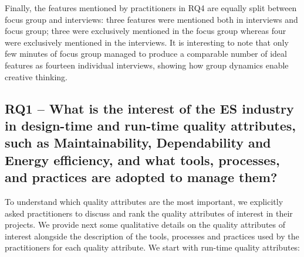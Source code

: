 Finally, the features mentioned by practitioners in RQ4 are equally split between focus group and interviews: three features were mentioned both in interviews and focus group; three were exclusively mentioned in the focus group whereas four were exclusively mentioned in the interviews.
It is interesting to note that only few minutes of focus group managed to produce a comparable number of ideal features as fourteen individual interviews, showing how group dynamics enable creative thinking.

\subsection{RQ1 -- What is the interest of the ES industry in design-time and run-time quality attributes,  such  as  Maintainability,  Dependability  and  Energy  efficiency,  and what tools, processes, and practices are adopted to manage them?}
To understand which quality attributes are the most important, we explicitly asked practitioners to discuss and rank the quality attributes of interest in their projects.
We provide next some qualitative details on the quality attributes of interest alongside the description of the tools, processes and practices used by the practitioners for each quality attribute.
We start with run-time quality attributes:
